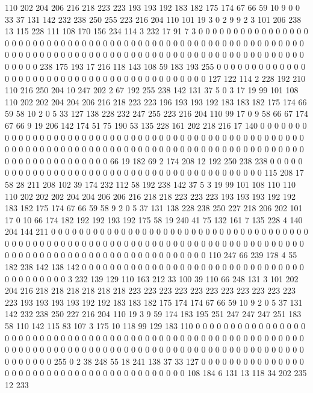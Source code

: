 110 202 204 206 216 218 223 223 193 193 192 183 182 175 174 67 66 59 10 9
0 0 33 37 131 142 232 238 250 255 223 216 204 110 101 19 3 0 2 9
9 2 3 101 206 238 13 115 228 111 108 170 156 234 114 3 232 17 91 7
3 0 0 0 0 0 0 0 0 0 0 0 0 0 0 0 0 0 0 0
0 0 0 0 0 0 0 0 0 0 0 0 0 0 0 0 0 0 0 0
0 0 0 0 0 0 0 0 0 0 0 0 0 0 0 0 0 0 0 0
0 0 0 0 0 0 0 0 0 0 0 0 0 0 0 0 0 0 0 0
0 0 0 0 0 0 0 0 0 0 0 0 0 0 0 0 0 0 0 0
0 0 0 0 0 0 0 0 238 175 193 17 216 118 143 108 59 183 193 255
0 0 0 0 0 0 0 0 0 0 0 0 0 0 0 0 0 0 0 0
0 0 0 0 0 0 0 0 0 0 0 0 0 0 0 0 0 0 0 0
0 0 127 122 114 2 228 192 210 110 216 250 204 10 247 202 2 67 192 255
238 142 131 37 5 0 3 17 19 99 101 108 110 202 202 204 204 206 216 218
223 223 196 193 193 192 183 183 182 175 174 66 59 58 10 2 0 5 33 127
138 228 232 247 255 223 216 204 110 99 17 0 9 58 66 67 174 67 66 9
19 206 142 174 51 75 190 53 135 228 161 202 218 216 17 140 0 0 0 0
0 0 0 0 0 0 0 0 0 0 0 0 0 0 0 0 0 0 0 0
0 0 0 0 0 0 0 0 0 0 0 0 0 0 0 0 0 0 0 0
0 0 0 0 0 0 0 0 0 0 0 0 0 0 0 0 0 0 0 0
0 0 0 0 0 0 0 0 0 0 0 0 0 0 0 0 0 0 0 0
0 0 0 0 0 0 0 0 0 0 0 0 0 0 0 0 0 0 0 0
0 0 0 0 66 19 182 69 2 174 208 12 192 250 238 238 0 0 0 0
0 0 0 0 0 0 0 0 0 0 0 0 0 0 0 0 0 0 0 0
0 0 0 0 0 0 0 0 0 0 0 0 0 0 0 0 0 0 115 208
17 58 28 211 208 102 39 174 232 112 58 192 238 142 37 5 3 19 99 101
108 110 110 110 202 202 202 204 204 206 206 216 218 218 223 223 223 193 193 193
192 192 183 182 175 174 67 66 59 58 9 2 0 5 37 131 138 228 238 250
227 218 206 202 101 17 0 10 66 174 182 192 192 193 192 175 58 19 240 41
75 132 161 7 135 228 4 140 204 144 211 0 0 0 0 0 0 0 0 0
0 0 0 0 0 0 0 0 0 0 0 0 0 0 0 0 0 0 0 0
0 0 0 0 0 0 0 0 0 0 0 0 0 0 0 0 0 0 0 0
0 0 0 0 0 0 0 0 0 0 0 0 0 0 0 0 0 0 0 0
0 0 0 0 0 0 0 0 0 0 0 0 0 0 0 0 0 0 0 0
0 0 0 0 0 0 0 0 0 0 0 0 0 0 0 0 0 0 0 0
110 247 66 239 178 4 55 182 238 142 138 142 0 0 0 0 0 0 0 0
0 0 0 0 0 0 0 0 0 0 0 0 0 0 0 0 0 0 0 0
0 0 0 0 0 0 0 0 0 0 0 0 0 3 232 139 129 110 163 212
33 100 39 110 66 248 131 3 101 202 204 216 218 218 218 218 218 218 223 223
223 223 223 223 223 223 223 223 223 223 193 193 193 193 192 192 183 183 182 175
174 174 67 66 59 10 9 2 0 5 37 131 142 232 238 250 227 216 204 110
19 3 9 59 174 183 195 251 247 247 247 251 183 58 110 142 115 83 107 3
175 10 118 99 129 183 110 0 0 0 0 0 0 0 0 0 0 0 0 0
0 0 0 0 0 0 0 0 0 0 0 0 0 0 0 0 0 0 0 0
0 0 0 0 0 0 0 0 0 0 0 0 0 0 0 0 0 0 0 0
0 0 0 0 0 0 0 0 0 0 0 0 0 0 0 0 0 0 0 0
0 0 0 0 0 0 0 0 0 0 0 0 0 0 0 0 0 0 0 0
0 0 0 0 0 0 0 0 0 0 0 0 0 0 0 0 255 0 2 38
248 55 18 241 138 37 33 127 0 0 0 0 0 0 0 0 0 0 0 0
0 0 0 0 0 0 0 0 0 0 0 0 0 0 0 0 0 0 0 0
0 0 0 0 0 0 0 0 0 108 184 6 131 13 118 34 202 235 12 233
